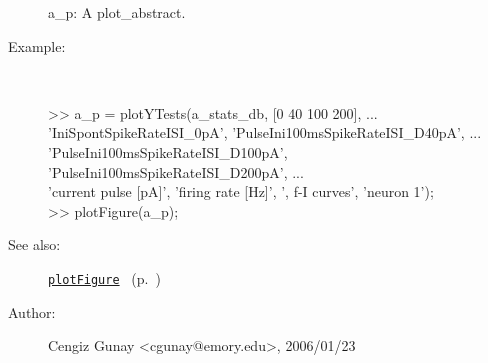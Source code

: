 \begin{description}
	a\_p: A plot\_abstract.
%
\item[Example:]~
\begin{lyxcode} >> a\_p = plotYTests(a\_stats\_db, [0 40 100 200], ...
\\%
                      {'IniSpontSpikeRateISI\_0pA', 'PulseIni100msSpikeRateISI\_D40pA', ...
\\%
                       'PulseIni100msSpikeRateISI\_D100pA', 'PulseIni100msSpikeRateISI\_D200pA'}, ...
\\%
                      {'current pulse [pA]', 'firing rate [Hz]'}, ', f-I curves', 'neuron 1');
\\%
 >> plotFigure(a\_p);
\\%
\end{lyxcode}
%
\item[See also:]%
\hyperlink{ref_plotFigure}{\texttt{plotFigure}}%
\ (p.~\pageref{ref_plotFigure})%
%
%
\item[Author:]%
Cengiz Gunay <cgunay@emory.edu>, 2006/01/23
%
\end{description}
\methodline%
